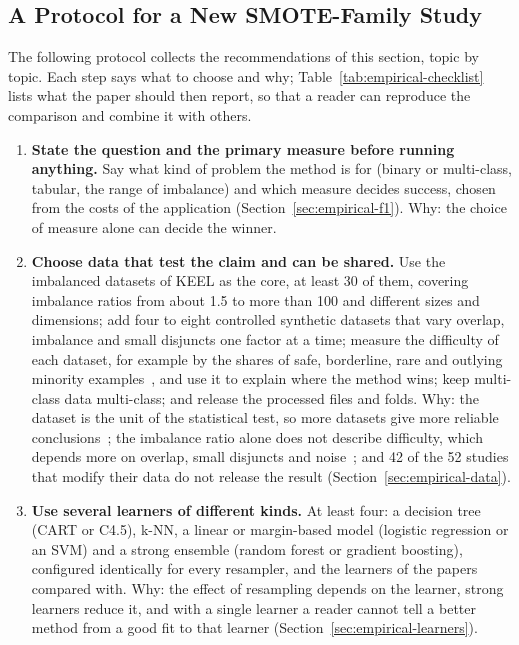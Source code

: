 

\subsection{A Protocol for a New SMOTE-Family Study}
\label{sec:empirical-protocol-new}

The following protocol collects the recommendations of this section, topic by topic. Each step says what to choose and why; Table~\ref{tab:empirical-checklist} lists what the paper should then report, so that a reader can reproduce the comparison and combine it with others.

\begin{enumerate}
  \item \textbf{State the question and the primary measure before running anything.} Say what kind of problem the method is for (binary or multi-class, tabular, the range of imbalance) and which measure decides success, chosen from the costs of the application (Section~\ref{sec:empirical-f1}). Why: the choice of measure alone can decide the winner.
  \item \textbf{Choose data that test the claim and can be shared.} Use the imbalanced datasets of KEEL as the core, at least 30 of them, covering imbalance ratios from about 1.5 to more than 100 and different sizes and dimensions; add four to eight controlled synthetic datasets that vary overlap, imbalance and small disjuncts one factor at a time; measure the difficulty of each dataset, for example by the shares of safe, borderline, rare and outlying minority examples~\parencite{napierala2016types}, and use it to explain where the method wins; keep multi-class data multi-class; and release the processed files and folds. Why: the dataset is the unit of the statistical test, so more datasets give more reliable conclusions~\parencite{demsar2006statistical}; the imbalance ratio alone does not describe difficulty, which depends more on overlap, small disjuncts and noise~\parencite{lopez2013insight}; and 42 of the 52 studies that modify their data do not release the result (Section~\ref{sec:empirical-data}).
  \item \textbf{Use several learners of different kinds.} At least four: a decision tree (CART or C4.5), k-NN, a linear or margin-based model (logistic regression or an SVM) and a strong ensemble (random forest or gradient boosting), configured identically for every resampler, and the learners of the papers compared with. Why: the effect of resampling depends on the learner, strong learners reduce it, and with a single learner a reader cannot tell a better method from a good fit to that learner (Section~\ref{sec:empirical-learners}).

\end{enumerate}
